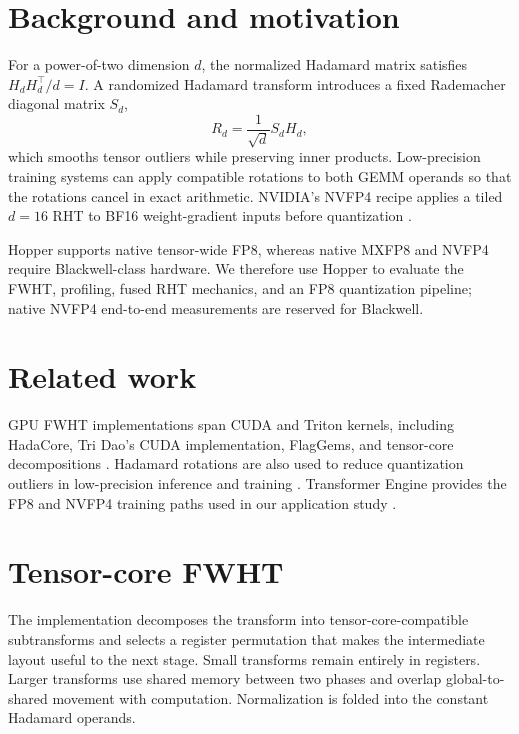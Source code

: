\documentclass{article}
\begin{document}
\section{Background and motivation}
For a power-of-two dimension $d$, the normalized Hadamard matrix satisfies
$H_d H_d^\top / d = I$. A randomized Hadamard transform introduces a fixed
Rademacher diagonal matrix $S_d$,
\begin{equation}
  R_d = \frac{1}{\sqrt d} S_d H_d,
\end{equation}
which smooths tensor outliers while preserving inner products. Low-precision
training systems can apply compatible rotations to both GEMM operands so that
the rotations cancel in exact arithmetic. NVIDIA's NVFP4 recipe applies a
tiled $d=16$ RHT to BF16 weight-gradient inputs before quantization
\citep{nvidia_nvfp4}.

Hopper supports native tensor-wide FP8, whereas native MXFP8 and NVFP4 require
Blackwell-class hardware. We therefore use Hopper to evaluate the FWHT,
profiling, fused RHT mechanics, and an FP8 quantization pipeline; native NVFP4
end-to-end measurements are reserved for Blackwell.

\section{Related work}
GPU FWHT implementations span CUDA and Triton kernels, including HadaCore,
Tri Dao's CUDA implementation, FlagGems, and tensor-core decompositions
\citep{TODO_hadacore,TODO_tri_dao_fwht,TODO_flaggems,TODO_arthur_fwht}.
Hadamard rotations are also used to reduce quantization outliers in low-precision
inference and training \citep{TODO_hadamard_quantization}. Transformer Engine
provides the FP8 and NVFP4 training paths used in our application study
\citep{TODO_transformer_engine_fp8}. 

\section{Tensor-core FWHT}
\label{sec:method}
The implementation decomposes the transform into tensor-core-compatible
subtransforms and selects a register permutation that makes the intermediate
layout useful to the next stage. Small transforms remain entirely in
registers. Larger transforms use shared memory between two phases and overlap
global-to-shared movement with computation. Normalization is folded into the
constant Hadamard operands.
\end{document}
